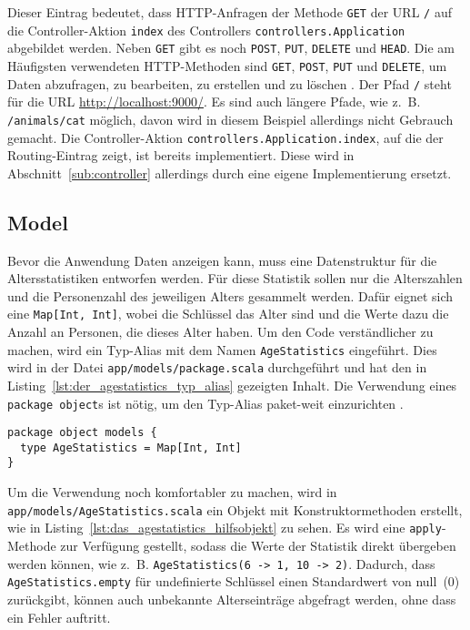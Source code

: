 Dieser Eintrag bedeutet, dass HTTP-Anfragen der Methode \lstinline|GET| der URL \lstinline|/| auf die Controller-Aktion \lstinline|index| des Controllers \lstinline[breaklines=true]|controllers.Application| abgebildet werden.
Neben \lstinline|GET| gibt es noch \lstinline|POST|, \lstinline|PUT|, \lstinline|DELETE| und \lstinline|HEAD|.
Die am Häufigsten verwendeten HTTP-Methoden sind \lstinline|GET|, \lstinline|POST|, \lstinline|PUT| und \lstinline|DELETE|, um Daten abzufragen, zu bearbeiten, zu erstellen und zu löschen \cite[vgl.][S.~6]{play_for_scala_v8}.
Der Pfad \lstinline|/| steht für die URL \url{http://localhost:9000/}.
Es sind auch längere Pfade, wie z.~B. \lstinline|/animals/cat| möglich, davon wird in diesem Beispiel allerdings nicht Gebrauch gemacht.
Die Controller-Aktion \lstinline|controllers.Application.index|, auf die der Routing-Eintrag zeigt, ist bereits implementiert.
Diese wird in Abschnitt~\ref{sub:controller} allerdings durch eine eigene Implementierung ersetzt.



\subsection{Model} %
\label{sub:model}

Bevor die Anwendung Daten anzeigen kann, muss eine Datenstruktur für die Altersstatistiken entworfen werden.
Für diese Statistik sollen nur die Alterszahlen und die Personenzahl des jeweiligen Alters gesammelt werden.
Dafür eignet sich eine \lstinline|Map[Int, Int]|, wobei die Schlüssel das Alter sind und die Werte dazu die Anzahl an Personen, die dieses Alter haben.
Um den Code verständlicher zu machen, wird ein Typ-Alias mit dem Namen \lstinline|AgeStatistics| eingeführt.
Dies wird in der Datei \lstinline[language=sh]|app/models/package.scala| durchgeführt und hat den in Listing~\ref{lst:der_agestatistics_typ_alias} gezeigten Inhalt.
Die Verwendung eines \lstinline|package object|s ist nötig, um den Typ-Alias paket-weit einzurichten \cite[vgl.][]{package_objects}.

\begin{lstlisting}[caption=Der AgeStatistics-Typ-Alias, label=lst:der_agestatistics_typ_alias]
package object models {
  type AgeStatistics = Map[Int, Int]
}
\end{lstlisting}

Um die Verwendung noch komfortabler zu machen, wird in \lstinline|app/models/AgeStatistics.scala| ein Objekt mit Konstruktormethoden erstellt, wie in Listing~\ref{lst:das_agestatistics_hilfsobjekt} zu sehen.
Es wird eine \lstinline|apply|-Methode zur Verfügung gestellt, sodass die Werte der Statistik direkt übergeben werden können, wie z.~B. \lstinline|AgeStatistics(6 -> 1, 10 -> 2)|.
Dadurch, dass \lstinline|AgeStatistics.empty| für undefinierte Schlüssel einen Standardwert von null~(0) zurückgibt, können auch unbekannte Alterseinträge abgefragt werden, ohne dass ein Fehler auftritt.

